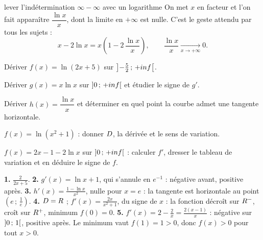 \begin{methode}{lever l'indétermination $\infty-\infty$ avec un logarithme}
On met $x$ en facteur et l'on fait apparaître $\dfrac{\ln x}{x}$, dont la
limite en $+\infty$ est nulle. C'est le geste attendu par tous les sujets :
\[
  x-2\ln x = x\left(1-2\,\frac{\ln x}{x}\right),
  \qquad
  \frac{\ln x}{x}\xrightarrow[x\to+\infty]{}0 .
\]
\end{methode}

\begin{entrainement}
\exo[\niveau{1}] Dériver $f(x) = \ln(2x+5)$ sur
$\left]-\frac52\,;\,+inf\right[$.

\exo[\niveau{2}] Dériver $g(x) = x\ln x$ sur $\left]0\,;\,+inf\right[$ et
étudier le signe de $g'$.

\exo[\niveau{2}] Dériver $h(x) = \dfrac{\ln x}{x}$ et déterminer en quel
point la courbe admet une tangente horizontale.

\exo[\niveau{2}] $f(x) = \ln\left(x^{2}+1\right)$ : donner $D$, la dérivée
et le sens de variation.

\exo[\niveau{3}] $f(x) = 2x-1-2\ln x$ sur $\left]0\,;\,+inf\right[$ :
calculer $f'$, dresser le tableau de variation et en déduire le signe de
$f$.
\end{entrainement}

\begin{corrige}
\textbf{1.} $\frac{2}{2x+5}$.
\textbf{2.} $g'(x) = \ln x+1$, qui s'annule en $e^{-1}$ : négative avant,
positive après.
\textbf{3.} $h'(x) = \frac{1-\ln x}{x^{2}}$, nulle pour $x = e$ : la
tangente est horizontale au point $\left(e\,;\,\frac1e\right)$.
\textbf{4.} $D = R$ ; $f'(x) = \frac{2x}{x^{2}+1}$, du signe de $x$ : la
fonction décroît sur $R^{-}$, croît sur $R^{+}$, minimum $f(0) = 0$.
\textbf{5.} $f'(x) = 2-\frac2x = \frac{2(x-1)}{x}$ : négative sur
$\left]0\,;\,1\right[$, positive après. Le minimum vaut $f(1) = 1 > 0$, donc
$f(x)>0$ pour tout $x>0$.
\end{corrige}

